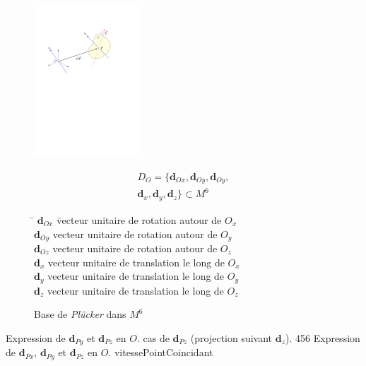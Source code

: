 \documentclass{report}
\begin{document}
\begin{figure}[H]
\begin{minipage}{.3\textwidth}
  \begin{center}
  \includegraphics[width=4cm, page=4]{figs/figures}
  \end{center}
\end{minipage}
\begin{minipage}{.3\textwidth} \hfill
  \begin{align*}
  D_{O} = \{ \textbf{d}_{Ox}, \textbf{d}_{Oy}, \textbf{d}_{Oy}, \\
  \textbf{d}_{x}, \textbf{d}_{y}, \textbf{d}_{z} \} \subset M^{6}
  \end{align*}
\end{minipage}
\begin{minipage}{.4\textwidth} \hfill
  \begin{tabbing}
  \= $\textbf{d}_{Ox}$ \= vecteur unitaire de rotation autour de $O_{x}$\\
  \> $\textbf{d}_{Oy}$ \> vecteur unitaire de rotation autour de $O_{y}$\\
  \> $\textbf{d}_{Oz}$ \> vecteur unitaire de rotation autour de $O_{z}$\\
  \> $\textbf{d}_{x}$  \> vecteur unitaire de translation le long de $O_{x}$\\
  \> $\textbf{d}_{y}$  \> vecteur unitaire de translation le long de $O_{y}$\\
  \> $\textbf{d}_{z}$  \> vecteur unitaire de translation le long de $O_{z}$\\
  \end{tabbing}
\end{minipage}
\caption{Base de \emph{Plücker} dans $M^{6}$}
\label{basePlucker}
\end{figure}



{Expression de $\textbf{d}_{Py}$ et $\textbf{d}_{Pz}$ en $O$.}
{cas de $\textbf{d}_{Pz}$ (projection suivant $\textbf{d}_{z}$).}
{4}{5}{6}
{Expression de $\textbf{d}_{Px}$, $\textbf{d}_{Py}$ et $\textbf{d}_{Pz}$ en $O$.}
{vitessePointCoincidant}
\end{document}
